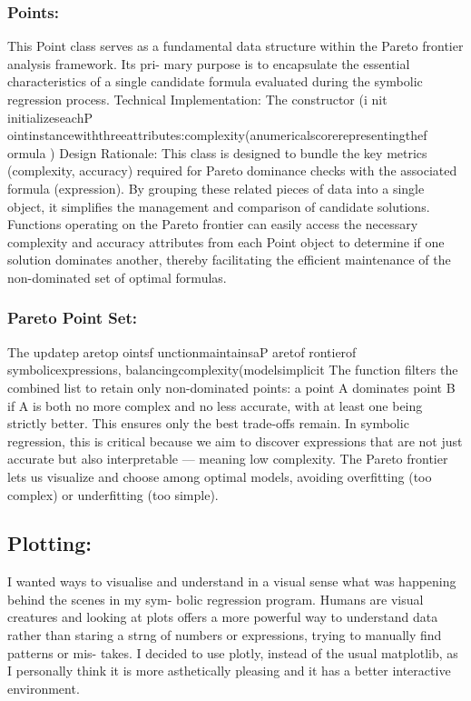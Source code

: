 \documentclass{article}
\begin{document}
{\subsubsection{Points:}

This Point class serves as a fundamental data structure within the Pareto frontier analysis framework. Its pri-
mary purpose is to encapsulate the essential characteristics of a single candidate formula evaluated during the
symbolic regression process.
Technical Implementation: The constructor (i nit initializeseachP ointinstancewiththreeattributes:complexity(anumericalscorerepresentingthef ormula
)
Design Rationale: This class is designed to bundle the key metrics (complexity, accuracy) required for Pareto
dominance checks with the associated formula (expression). By grouping these related pieces of data into a
single object, it simplifies the management and comparison of candidate solutions. Functions operating on
the Pareto frontier can easily access the necessary complexity and accuracy attributes from each Point object to
determine if one solution dominates another, thereby facilitating the efficient maintenance of the non-dominated
set of optimal formulas.\\


\subsubsection{Pareto Point Set:}

The updatep aretop ointsf unctionmaintainsaP aretof rontierof symbolicexpressions, balancingcomplexity(modelsimplicit
The function filters the combined list to retain only non-dominated points: a point A dominates point B if A is
both no more complex and no less accurate, with at least one being strictly better. This ensures only the best
trade-offs remain.
In symbolic regression, this is critical because we aim to discover expressions that are not just accurate but
also interpretable — meaning low complexity. The Pareto frontier lets us visualize and choose among optimal
models, avoiding overfitting (too complex) or underfitting (too simple).\\ 


\subsection{Plotting: }

I wanted ways to visualise and understand in a visual sense what was happening behind the scenes in my sym-
bolic regression program. Humans are visual creatures and looking at plots offers a more powerful way to understand data rather than staring a strng of numbers or expressions, trying to manually find patterns or mis-
takes.
I decided to use plotly, instead of the usual matplotlib, as I personally think it is more asthetically pleasing and
it has a better interactive environment.\\ 


}
\end{document}
